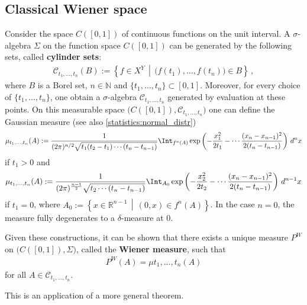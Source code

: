 \subsection{Classical Wiener space}\label{section:classical_wiener_space}

    Consider the space $C([0,1])$ of continuous functions on the unit interval. A $\sigma$-algebra $\Sigma$ on the function space $C([0,1])$ can be generated by the following sets, called \textbf{cylinder sets}:
    \begin{gather}
        \mathcal{C}_{t_1,\ldots,t_n}(B) := \left\{f\in X^Y\,\middle\vert\,\bigl(f(t_1),\ldots,f(t_n)\bigr)\in B\right\}\,,
    \end{gather}
    where $B$ is a Borel set, $n\in\mathbb{N}$ and $\{t_1,\ldots,t_n\}\subset[0,1]$. Moreover, for every choice of $\{t_1,\ldots,t_n\}$, one obtain a $\sigma$-algebra $\mathcal{C}_{t_1,\ldots,t_n}$ generated by evaluation at these points. On this measurable space $\bigl(C([0,1]),\mathcal{C}_{t_1,\ldots,t_n}\bigr)$ one can define the Gaussian measure (see also \cref{statistics:normal_distr})
    \begin{gather}
        \mu_{t_1,\ldots,t_n}(A) := \frac{1}{(2\pi)^{n/2}\sqrt{t_1(t_2-t_1)\cdots(t_n-t_{n-1})}}\Int_{f^n(A)}\exp\left(-\frac{x_1^2}{2t_1}-\cdots\frac{(x_n-x_{n-1})^2}{2(t_n-t_{n-1})}\right)\,d^nx
    \end{gather}
    if $t_1>0$ and
    \begin{gather}
        \mu_{t_1,\ldots,t_n}(A) := \frac{1}{(2\pi)^{\frac{n-1}{2}}\sqrt{t_2\cdots(t_n-t_{n-1})}}\Int_{A_0}\exp\left(-\frac{x_2^2}{2t_2}-\cdots\frac{(x_n-x_{n-1})^2}{2(t_n-t_{n-1})}\right)\,d^{n-1}x
    \end{gather}
    if $t_1=0$, where $A_0 := \left\{x\in\mathbb{R}^{n-1}\,\middle\vert\,(0,x)\in f^{n}(A)\right\}$. In the case $n=0$, the measure fully degenerates to a $\delta$-measure at 0.

    Given these constructions, it can be shown that there exists a unique measure $P^W$ on $\bigl(C([0,1]),\Sigma\bigr)$, called the \textbf{Wiener measure}, such that
    \begin{gather}
        P^W(A) = \mu{t_1,\ldots,t_n}(A)
    \end{gather}
    for all $A\in\mathcal{C}_{t_1,\ldots,t_n}$.

    This is an application of a more general theorem.
    \begin{theorem}
    \end{theorem}

